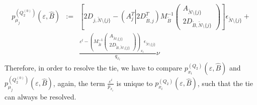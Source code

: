 \documentclass[a4paper]{article}
\newcommand{\pmu}[2]{\ensuremath{p_{\mu_{j}}^{(#1)}(\varepsilon, #2)}}
\begin{document}
\begin{eqnarray}
\label{def:p_mu_j_Q_2_0}
\pmu{Q_{2}^{(0)}}{\hat{B}} &:=& 
  \left[
      2D_{j, \tilde{N}\setminus \{j\}}
        -\left(A_{j}^{T} \left| \right. 2D_{\tilde{B}, j}^{T}
       \right)
      M_{\tilde{B}}^{-1}
      \left(\begin{array}{c}
              A_{\tilde{N} \setminus \{j\}} \\
	      \hline
	      2D_{\tilde{B}, \tilde{N} \setminus \{j\}}
	    \end{array}
      \right)
   \right]\epsilon_{\tilde{N} \setminus \{j\}} + 
 \nonumber \\ 
  &&
  \frac{\varepsilon^{l} -
         \left(M_{\tilde{B}}^{-1}
           \left(\begin{array}{c}
                    A_{\tilde{N} \setminus \{j\}}  \\
	            \hline
	            2D_{\tilde{B}, \tilde{N} \setminus \{j\}}
	         \end{array}
	   \right)
         \right)_{x_{l}}\epsilon_{\tilde{N} \setminus \{j\}}}{q_{x_{l}}}\nu
\end{eqnarray}
Therefore, in order to resolve the tie, we have to compare
$p_{x_{i}}^{(Q_{2})}(\varepsilon, \hat{B})$ and
\pmu{Q_{2}^{(0)}}{\hat{B}}, again,
the term $\frac{\varepsilon^{i}}{p_{x_{i}}}$ is unique to
$p_{x_{i}}^{(Q_{2})}(\varepsilon, \hat{B})$, such that the tie can
always be resolved.
\end{document}

